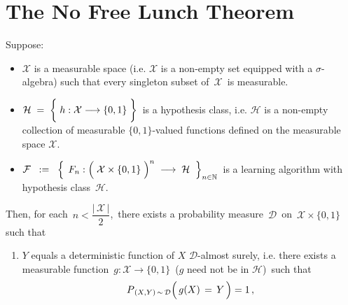 

\section{The No Free Lunch Theorem}
\setcounter{theorem}{0}
\setcounter{equation}{0}


\renewcommand{\theenumi}{\roman{enumi}}
\renewcommand{\labelenumi}{\textnormal{(\theenumi)}$\;\;$}


\begin{theorem}
\label{Thm:NoFreeLunch}
\mbox{}\vskip 0.1cm
\noindent
Suppose:
\begin{itemize}
\item
	$\mathcal{X}$ is a measurable space (i.e. $\mathcal{X}$ is a non-empty set equipped with a $\sigma$-algebra)
	such that every singleton subset of \,$\mathcal{X}$\, is measurable.
\item
	$\mathcal{H} \; = \; \left\{\; h : \mathcal{X} \overset{{\color{white}\vert}}{\longrightarrow} \{0,1\}\;\right\}$\,
	is a hypothesis class, i.e.
	$\mathcal{H}$ is a non-empty collection of measurable $\{0,1\}$-valued functions defined on the
	measurable space $\mathcal{X}$.
\item
	$\mathcal{F}
	\;\; : = \;\;
		\left\{\;\,
			F_{n} : \left(\;\mathcal{X} \overset{{\color{white}.}}{\times} \{0,1\} \;\right)^{n}
			\; \longrightarrow \;\mathcal{H}
			\;\;\right\}_{n\in\N}$\,
	is a learning algorithm with hypothesis class \,$\mathcal{H}$.
\end{itemize}
Then, for each \,$n < \dfrac{\vert\,\mathcal{X}\,\vert}{2}$,\,
there exists a probability measure \,$\mathcal{D}$\, on
\,$\mathcal{X} \times \{0,1\}$\,
such that
\begin{enumerate}
\item
	$Y$ equals a deterministic function of $X$ $\mathcal{D}$-almost surely, i.e. there exists a
	measurable function \,$g : \mathcal{X} \longrightarrow \{0,1\} $\, ($g$ need not be in $\mathcal{H}$)\,
	such that
	\begin{equation*}
	P_{\,(X,Y)\,\sim\,\mathcal{D}}\!\left(\,g(X) \,\overset{{\color{white}-}}{=}\, Y\,\right) = 1\,,

\end{equation*}
\end{enumerate}
\end{theorem}
